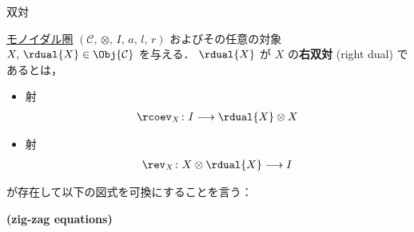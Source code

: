 \documentclass[TQFT_main]{subfiles}
\begin{document}
\begin{mydef}[label=redef:dual,breakable]{双対}
\begin{description}
        \begin{center}
        \end{center}
    \end{description}
    \tcblower

    \hyperref[def:monoidal-category]{モノイダル圏} $(\mathcal{C},\, \otimes,\, I,\, a,\, l,\, r)$ およびその任意の対象 $X,\, \rdual{X} \in \Obj{\mathcal{C}}$ を与える．
    $\rdual{X}$ が $X$ の\textbf{右双対} (right dual) であるとは，
    \begin{itemize}
        \item 射 \begin{align}
            \rcoev_X \colon I \lto \rdual{X} \otimes X
        \end{align}
        \item 射 \begin{align}
            \rev_X \colon X \otimes \rdual{X} \lto I
        \end{align}
    \end{itemize}
    が存在して以下の図式を可換にすることを言う：
    \begin{description}
        \item[\textbf{(zig-zag equations)}]　
        
        \begin{center}
        \end{center}


\end{description}
\end{mydef}
\end{document}
